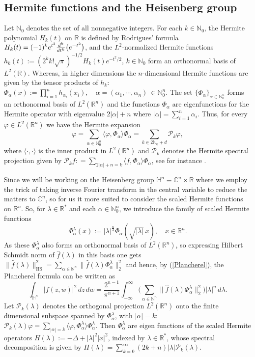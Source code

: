\documentclass[11pt, reqno]{amsart}
\theoremstyle{plain}
\newcommand{\R}{\ensuremath{\mathbb{R_+}}}
\theoremstyle{remark}
\theoremstyle{example}
\theoremstyle{definition}
\numberwithin{equation}{section}
\newcommand{\N}{\mathbb N}
\def\R{\mathbb{R}}
\def\H{\mathbb{H}}
\def\Ha{\mathbb{H}^n}
\newcommand{\Ca}{\mathbb{C}^n}
\newcommand{\inp}[2]{\langle #1, #2\rangle}
\begin{document}
\subsection{Hermite functions and the Heisenberg group}
\label{sec:Hermite}
Let $\N_{0}$ denotes the set of all nonnegative integers. For each $k\in \N_0$, the Hermite polynomial $H_k(t) $ on $\mathbb R$ is defined by  Rodrigues' formula $H_k(t)=(-1)^k e^{t^2} {d^k\over d t^k} \big(e^{-t^2}\big)$, and  the $L^2$-normalized  Hermite functions
$h_k(t):=(2^k k !  \sqrt{\pi})^{-1/2} H_k(t) e^{-t^2/2}$, $k\in \mathbb N_0$ form an orthonormal basis
of $L^2(\mathbb R)$.   Whereas, in higher dimensions  
 the $n$-dimensional Hermite functions are given by the tensor products of $h_k$: $\Phi_{\alpha}(x):=\prod_{i=1}^n h_{\alpha_i}(x_i), \quad \alpha=(\alpha_1, \cdots, \alpha_n)\ {\in\N_0^n.}$
The set $\{\Phi_{\alpha}\}_{\alpha\in \mathbb N_0^n}$ forms an orthonormal basis of $L^2(\mathbb R^n)$ and the functions $\Phi_{\alpha}$ are eigenfunctions for the Hermite operator with eigenvalue  $2|\alpha|+n$ where $|\alpha|=\sum_{i=1}^n \alpha_i$. 
Thus, for  every $\varphi \in L^2(\mathbb R^n)$  we have  the Hermite expansion
\[ 
\varphi =\sum_{\alpha\in\N_0^n} \inp{\varphi}{\Phi_\alpha}\Phi_\alpha=\sum_{k \in 2\N_0+d} \mathcal{P}_{k} \varphi,
\]
where $\langle \cdot, \cdot \rangle$ is the inner product in $L^2(\R^n)$ and $\mathcal{P}_{k}$ denotes the Hermite spectral projection given by $\mathcal{P}_{k}f : =\sum_{2|\alpha|+n= k}\langle f, \Phi_{\alpha}\rangle\Phi_{\alpha}$, see for instance \cite[Chapter 1.4]{Thangavelu-Heisenberg}.

Since we will be working on  the Heisenberg group $\Ha \equiv \Ca \times \R$ where we employ the trick of taking inverse Fourier transform in the central variable to reduce the matters to $\Ca$, so for us it more suited to consider the scaled Hermite functions on $\R^n$. So, for $\lambda\in \R^*$ and each $ \alpha \in \N_{0}^n $, we introduce the family of scaled Hermite functions
$$
\Phi_\alpha^\lambda(x) := |\lambda|^{\frac{n}{4}}\Phi_\alpha(\sqrt{|\lambda|} \, x), \quad x\in \R^n.
$$
As these $ \Phi_\alpha^\lambda $ also forms an orthonormal  basis of $L^{2}(\R^n)$, so expressing Hilbert Schmidt norm of $\widehat{f}(\lambda)$ in this basis one gets
$ \|\widehat{f}(\lambda)\|_{\operatorname{HS}}^2=\sum_{\alpha\in \N^n}\|\widehat{f}(\lambda) \Phi_\alpha^\lambda \|_{2}^2 $
and hence, by (\ref{Plancherel}), the Plancherel formula can be written as
$$
\int_{\H^n}|f(z,w)|^2\,dz\,dw=\frac{2^{n-1}}{\pi^{n+1}}
\int_{-\infty}^{\infty}\Big(\sum_{\alpha\in \N^n}\|\widehat{f}(\lambda)\Phi_\alpha^\lambda\|_{2}^2\Big)|\lambda|^n\,d\lambda.
$$
Let $\mathcal{P}_{k} (\lambda)$ denotes the orthogonal projection $L^{2}(\R^n)$ onto the finite dimensional subspace spanned by $\Phi_{\alpha}^{\lambda}$,  with $|\alpha|=k$: $ \mathcal{P}_{k}(\lambda)\varphi = \sum_{|\alpha| =k} \langle \varphi,\Phi_\alpha^\lambda \rangle \Phi_\alpha^\lambda$. Then $\Phi_{\alpha}^{\lambda}$ are eigen functions of the scaled Hermite operators  $ H(\lambda) :=  -\Delta+|\lambda|^2 |x|^2 $, indexed by $\lambda \in \R^{*}$, whose spectral decomposition is given by $H(\lambda) = \sum_{k=0}^\infty (2k+n)|\lambda| \mathcal{P}_{k}(\lambda)$.
\end{document}
